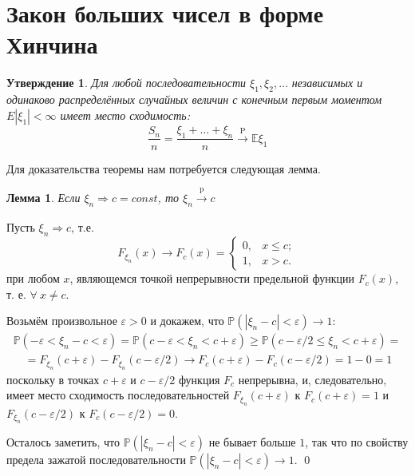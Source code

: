 \documentclass[oneside,final,14pt]{extreport}
\renewenvironment{proof}{{\bfseries Доказательство.}}{\qed}
\theoremstyle{plain}
\newtheorem*{thm*}{Утверждение}
\newtheorem*{lem}{Лемма}
\theoremstyle{definition}
\theoremstyle{named}
\begin{document}
\section{Закон больших чисел в форме Хинчина}
\begin{thm*}
    Для любой последовательности $\xi_{1}, \xi_{2}, \ldots$ независимых и одинаково распределённых случайных величин с конечным первым моментом $E\left|\xi_{1}\right|<\infty$ имеет место сходимость:
    \begin{equation*}
        \frac{S_{n}}{n} = \frac{\xi_{1}+\ldots+\xi_{n}}{n} \overset{\text{P}}{\longrightarrow} \mathbb{E} \xi_{1}
    \end{equation*}
\end{thm*}
Для доказательства теоремы нам потребуется следующая лемма.
\begin{lem}
    Если $\xi_{n} \Rightarrow c=const$, то $\xi_{n} \xrightarrow[]{\text{p}} c$
\end{lem}
\begin{proof}
    Пусть $\xi_{n} \Rightarrow c$, т.е.
    \begin{equation*}
        F_{\xi_{n}}(x) \rightarrow F_{c}(x) =
        \begin{cases}
            0, & x \leqslant c; \\
            1, & x > c.
        \end{cases}
    \end{equation*}
    при любом $x$, являющемся точкой непрерывности предельной функции $F_{c}(x)$, т. е. $\forall~ x \neq c$.
    
    Возьмём произвольное $\varepsilon>0$ и докажем, что $\mathbb{P}\left(\left|\xi_{n}-c\right|<\varepsilon\right) \rightarrow 1$:
    \begin{multline*}
        \mathbb{P}\left(-\varepsilon<\xi_{n}-c<\varepsilon\right)=\mathbb{P}\left(c-\varepsilon<\xi_{n}<c+\varepsilon\right) \geqslant \mathbb{P}\left(c-\varepsilon / 2 \leqslant \xi_{n}<c+\varepsilon\right)= \\
        \quad=F_{\xi_{n}}(c+\varepsilon)-F_{\xi_{n}}(c-\varepsilon / 2) \rightarrow F_{c}(c+\varepsilon)-F_{c}(c-\varepsilon / 2)=1-0=1
    \end{multline*}
    поскольку в точках $c+\varepsilon$ и $c-\varepsilon / 2$ функция $F_{c}$ непрерывна, и, следовательно, имеет место сходимость последовательностей $F_{\xi_{n}}(c+\varepsilon)$ к $F_{c}(c+\varepsilon)=1$ и $F_{\xi_{n}}(c-\varepsilon / 2)$ к $F_{c}(c-\varepsilon / 2)=0$.
    
    Осталось заметить, что $\mathbb{P}\left(\left|\xi_{n}-c\right|<\varepsilon\right)$ не бывает больше $1$, так что по свойству предела зажатой последовательности $\mathbb{P}\left(\left|\xi_{n}-c\right|<\varepsilon\right) \rightarrow 1$.
\end{proof}
\end{document}
